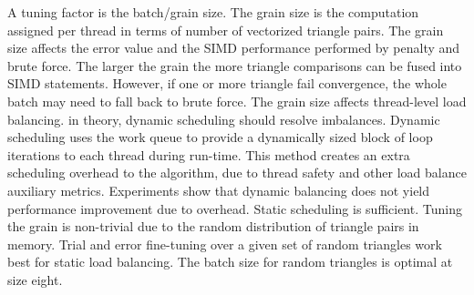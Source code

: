 \documentclass[times,12pt]{article}
\begin{document}
A tuning factor is the batch/grain size. The grain size is the computation assigned per thread in terms of number of vectorized triangle pairs. The grain size affects the error value and the SIMD performance performed by penalty and brute force. The larger the grain the more triangle comparisons can be fused into SIMD statements. However, if one or more triangle fail convergence, the whole batch may need to fall back to brute force. The grain size affects thread-level load balancing. in theory, dynamic scheduling should resolve imbalances. Dynamic scheduling uses the work queue to provide a dynamically sized block of loop iterations to each thread during run-time. This method creates an extra scheduling overhead to the algorithm, due to thread safety and other load balance auxiliary metrics. Experiments show that dynamic balancing does not yield performance improvement due to overhead. Static scheduling is sufficient. Tuning the grain is non-trivial due to the random distribution of triangle pairs in memory. Trial and error fine-tuning over a given set of random triangles work best for static load balancing. The batch size for random triangles is optimal at size eight.

\clearpage
\end{document}
